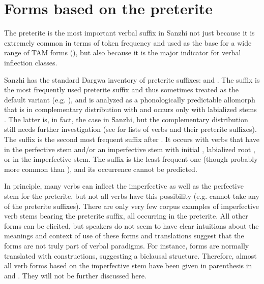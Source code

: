
\section{Forms based on the preterite}
\label{sec:Forms based on the preterite}

The preterite is the most important verbal suffix in Sanzhi not just because it is extremely common in terms of token frequency and used as the base for a wide range of TAM forms (), but also because it is the major indicator for verbal inflection classes.

Sanzhi has the standard Dargwa inventory of preterite suffixes:  and . The suffix  is the most frequently used preterite suffix and thus sometimes treated as the default variant (e.g. ), and  is analyzed as a phonologically predictable allomorph that is in complementary distribution with  and occurs only with labialized stems \citep{BelyaevInPreparation}. The latter is, in fact, the case in Sanzhi, but the complementary distribution still needs further investigation (see  for lists of verbs and their preterite suffixes). The suffix  is the second most frequent suffix after . It occurs with verbs that have  in the perfective stem and/or an imperfective stem with initial , labialized root , or  in the imperfective stem. The suffix  is the least frequent one (though probably more common than ), and its occurrence cannot be predicted.

In principle, many verbs can inflect the imperfective as well as the perfective stem for the preterite, but not all verbs have this possibility (e.g.   cannot take any of the preterite suffixes). There are only very few corpus examples of imperfective verb stems bearing the preterite suffix, all occurring in the preterite. All other forms can be elicited, but speakers do not seem to have clear intuitions about the meanings and context of use of these forms and translations suggest that the forms are not truly part of verbal paradigms. For instance,  forms are normally translated with  constructions, suggesting a biclausal structure.  Therefore, almost all verb forms based on the imperfective stem have been given in parenthesis in  and . They will not be further  discussed here.

